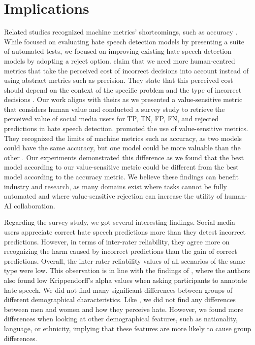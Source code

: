 \section{Implications}
Related studies recognized machine metrics' shortcomings, such as accuracy \citep{casati2021value,olteanu2017limits,rottger2020hatecheck}.
%
%
While \citet{rottger2020hatecheck} focused on evaluating hate speech detection models by presenting a suite of automated tests, we focused on improving existing hate speech detection models by adopting a reject option.
%
\citet{olteanu2017limits} claim that we need more human-centred metrics that take the perceived cost of incorrect decisions into account instead of using abstract metrics such as precision.
%
They state that this perceived cost should depend on the context of the specific problem and the type of incorrect decisions \citep{olteanu2017limits}.
%
Our work aligns with theirs as we presented a value-sensitive metric that considers human value and conducted a survey study to retrieve the perceived value of social media users for TP, TN, FP, FN, and rejected predictions in hate speech detection.
%
%
\citet{casati2021value} promoted the use of value-sensitive metrics.
%
They recognized the limits of machine metrics such as accuracy, as two models could have the same accuracy, but one model could be more valuable than the other \citep{casati2021value}.
%
Our experiments demonstrated this difference as we found that the best model according to our value-sensitive metric could be different from the best model according to the accuracy metric.
%
We believe these findings can benefit industry and research, as many domains exist where tasks cannot be fully automated and where value-sensitive rejection can increase the utility of human-AI collaboration.
%

%
Regarding the survey study, we got several interesting findings.
%
Social media users appreciate correct hate speech predictions more than they detest incorrect predictions.
%
However, in terms of inter-rater reliability, they agree more on recognizing the harm caused by incorrect predictions than the gain of correct predictions.
%
Overall, the inter-rater reliability values of all scenarios of the same type were low.
%
This observation is in line with the findings of \citet{ross2017measuring}, where the authors also found low Krippendorff's alpha values when asking participants to annotate hate speech.
%
We did not find many significant differences between groups of different demographical characteristics.
%
Like \citet{gold2018women}, we did not find any differences between men and women and how they perceive hate.
%
However, we found more differences when looking at other demographical features, such as nationality, language, or ethnicity, implying that these features are more likely to cause group differences.
%

